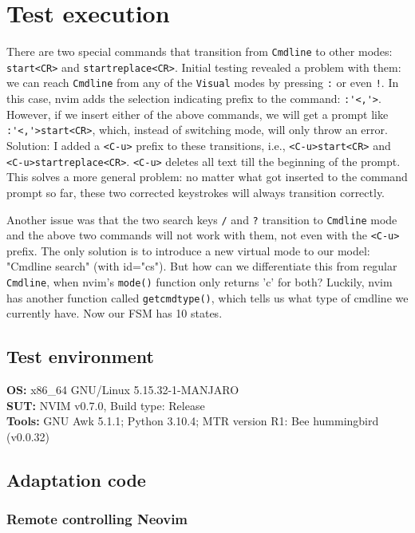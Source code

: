 \documentclass[12pt]{article}
\begin{document}
\section{Test execution}

	There are two special commands that transition from \verb|Cmdline| to other modes: \verb|start<CR>| and \verb|startreplace<CR>|. Initial testing revealed a problem with them: we can reach \verb|Cmdline| from any of the \verb|Visual| modes by pressing \verb|:| or even \verb|!|. In this case, nvim adds the selection indicating prefix to the command: \verb|:'<,'>|. However, if we insert either of the above commands, we will get a prompt like \verb|:'<,'>start<CR>|, which, instead of switching mode, will only throw an error. Solution: I added a \verb|<C-u>| prefix to these transitions, i.e., \verb|<C-u>start<CR>| and \verb|<C-u>startreplace<CR>|. \verb|<C-u>| deletes all text till the beginning of the prompt. This solves a more general problem: no matter what got inserted to the command prompt so far, these two corrected keystrokes will always transition correctly.

	Another issue was that the two search keys \verb|/| and \verb|?| transition to \verb|Cmdline| mode and the above two commands will not work with them, not even with the \verb|<C-u>| prefix. The only solution is to introduce a new virtual mode to our model: "Cmdline search" (with id="cs"). But how can we differentiate this from regular \verb|Cmdline|, when nvim's \verb|mode()| function only returns 'c' for both? Luckily, nvim has another function called \verb|getcmdtype()|, which tells us what type of cmdline we currently have. Now our FSM has 10 states.

	\subsection{Test environment}

	{\parindent0pt
	\textbf{OS:} x86\_64 GNU/Linux 5.15.32-1-MANJARO\\
	\textbf{SUT:} NVIM v0.7.0, Build type: Release\\
	\textbf{Tools:} GNU Awk 5.1.1; Python 3.10.4; MTR version R1: Bee hummingbird (v0.0.32)
	}

	\subsection{Adaptation code}

		\subsubsection{Remote controlling Neovim}
\end{document}

